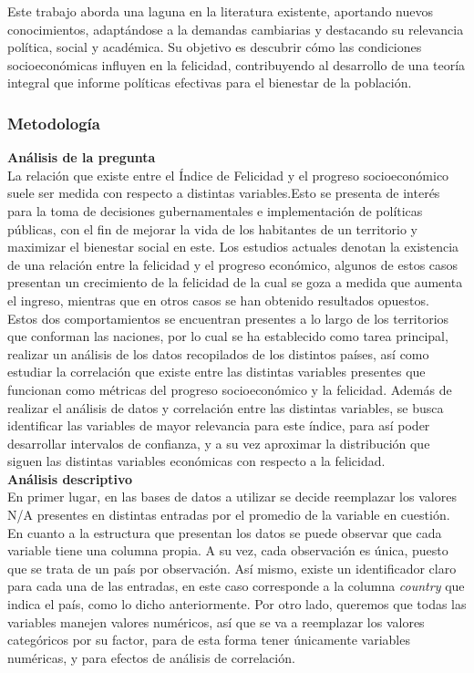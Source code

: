 Este trabajo aborda una laguna en la literatura existente, aportando nuevos conocimientos, adaptándose a la demandas cambiarias y destacando su relevancia política, social y académica. Su objetivo es descubrir cómo las condiciones socioeconómicas influyen en la felicidad, contribuyendo al desarrollo de una teoría integral que informe políticas efectivas para el bienestar de la población. \\

\subsubsection{Metodología}

\textbf{Análisis de la pregunta} \\

La relación que existe entre el Índice de Felicidad y el progreso socioeconómico suele ser medida con respecto a distintas variables.Esto se presenta de interés para la toma de decisiones gubernamentales e implementación de políticas públicas, con el fin de mejorar la vida de los habitantes de un territorio y maximizar el bienestar social en este. Los estudios actuales denotan la existencia de una relación entre la felicidad y el progreso económico, algunos de estos casos presentan un crecimiento de la felicidad de la cual se goza a medida que aumenta el ingreso, mientras que en otros casos se han obtenido resultados opuestos. \\

Estos dos comportamientos se encuentran presentes a lo largo de los territorios que conforman las naciones, por lo cual se ha establecido como tarea principal, realizar un análisis de los datos recopilados de los distintos países, así como estudiar la correlación que existe entre las distintas variables presentes que funcionan como métricas del progreso socioeconómico y la felicidad. Además de realizar el análisis de datos y correlación entre las distintas variables, se busca identificar las variables de mayor relevancia para este índice, para así poder desarrollar intervalos de confianza, y a su vez aproximar la distribución que siguen las distintas variables económicas con respecto a la felicidad. \\

\textbf{Análisis descriptivo}\\

En primer lugar, en las bases de datos a utilizar se decide reemplazar los valores N/A presentes en distintas entradas por el promedio de la variable en cuestión. En cuanto a la estructura que presentan los datos se puede observar que cada variable tiene una columna propia. A su vez, cada observación es única, puesto que se trata de un país por observación. Así mismo, existe un identificador claro para cada una de las entradas, en este caso corresponde a la columna \textit{country} que indica el país, como lo dicho anteriormente. Por otro lado, queremos que todas las variables manejen valores numéricos, así que se va a reemplazar los valores categóricos por su factor, para de esta forma tener únicamente variables numéricas, y para efectos de análisis de correlación.\\


